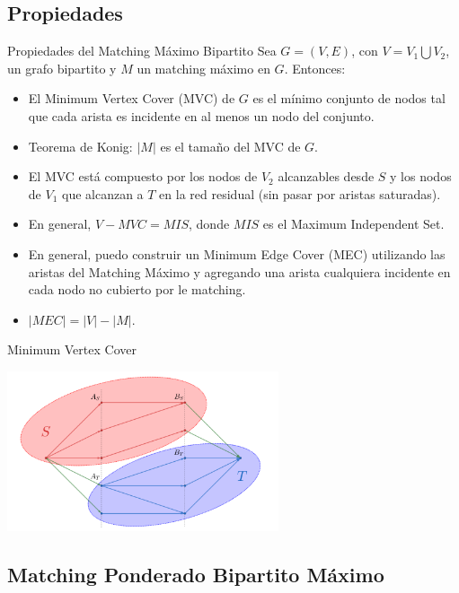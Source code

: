 \documentclass{beamer}
\begin{document}
\subsection{ Propiedades }

\begin{frame}{Propiedades del Matching Máximo Bipartito}
    Sea $G=(V,E)$, con $V = V_1 \bigcup V_2$, un grafo bipartito y $M$ un matching máximo en $G$. Entonces:
    
    \begin{itemize}
        \item El Minimum Vertex Cover (MVC) de $G$ es el mínimo conjunto de nodos tal que cada arista es incidente en al menos un nodo del conjunto.
        \pause
        \item Teorema de Konig: $|M|$ es el tamaño del MVC de $G$.
        \pause
        \item El MVC está compuesto por los nodos de $V_2$ alcanzables desde $S$ y los nodos de $V_1$ que alcanzan a $T$ en la red residual (sin pasar por aristas saturadas).
        \pause
        \item En general, $V - MVC = MIS$, donde $MIS$ es el Maximum Independent Set.
        \pause 
        \item En general, puedo construir un Minimum Edge Cover (MEC) utilizando las aristas del Matching Máximo y agregando una arista cualquiera incidente en cada nodo no cubierto por le matching.
        \item $|MEC| = |V| - |M|$.
    \end{itemize}
\end{frame}
    
\begin{frame}{Minimum Vertex Cover}

    \begin{center}
        \includegraphics[width=0.6\textwidth]{imgs/mvc.png}
    \end{center}
\end{frame}
\subsection{ Matching Ponderado Bipartito Máximo }
\end{document}
